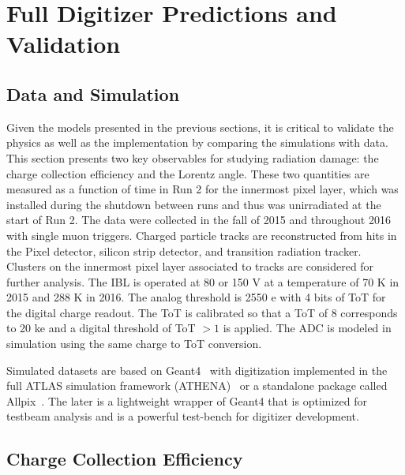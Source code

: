 \section{Full Digitizer Predictions and Validation}
\label{sec:digivalidation}


\subsection{Data and Simulation}

Given the models presented in the previous sections, it is critical to validate the physics as well as the implementation by comparing the simulations with data.  This section presents two key observables for studying radiation damage: the charge collection efficiency and the Lorentz angle.  These two quantities are measured as a function of time in Run 2 for the innermost pixel layer, which was installed during the shutdown between runs and thus was unirradiated at the start of Run 2.  The data were collected in the fall of 2015 and throughout 2016 with single muon triggers.  Charged particle tracks are reconstructed from hits in the Pixel detector, silicon strip detector, and transition radiation tracker.  Clusters on the innermost pixel layer associated to tracks are considered for further analysis.  The IBL is operated at 80 or 150 V at a temperature of 70 K in 2015 and 288 K in 2016.  The analog threshold is 2550 e with 4 bits of ToT for the digital charge readout.  The ToT is calibrated so that a ToT of 8 corresponds to 20 ke and a digital threshold of ToT $>1$ is applied.  The ADC is modeled in simulation using the same charge to ToT conversion.

Simulated datasets are based on Geant4~\cite{Agostinelli:2002hh} with digitization implemented in the full ATLAS simulation framework (ATHENA)~\cite{Aad:2010ah} or a standalone package called Allpix~\cite{benoit:20xx}.  The later is a lightweight wrapper of Geant4 that is optimized for testbeam analysis and is a powerful test-bench for digitizer development.


\subsection{Charge Collection Efficiency}
\label{sec:CCE}

